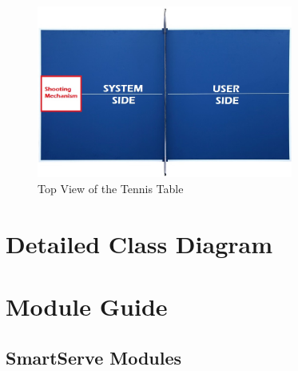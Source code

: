 \documentclass[11pt]{article}
\begin{document}
\begin{figure}[H]
   \centering
   \includegraphics[width=0.75\textwidth]{../img/Table-Tennis-Top-View.png} %
   \caption{Top View of the Tennis Table}
   \label{fig:table-tennis-top-view}
\end{figure}

\section{Detailed Class Diagram}

\section{Module Guide}
\subsection{SmartServe Modules} %
\end{document}
